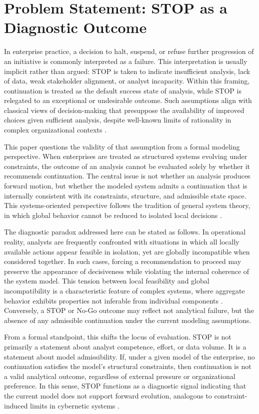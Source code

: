 ﻿\section{Problem Statement: STOP as a Diagnostic Outcome}

In enterprise practice, a decision to halt, suspend, or refuse further progression of an initiative is commonly interpreted as a failure. This interpretation is usually implicit rather than argued: STOP is taken to indicate insufficient analysis, lack of data, weak stakeholder alignment, or analyst incapacity. Within this framing, continuation is treated as the default success state of analysis, while STOP is relegated to an exceptional or undesirable outcome. Such assumptions align with classical views of decision-making that presuppose the availability of improved choices given sufficient analysis, despite well-known limits of rationality in complex organizational contexts \cite{simon1957}.

This paper questions the validity of that assumption from a formal modeling perspective. When enterprises are treated as structured systems evolving under constraints, the outcome of an analysis cannot be evaluated solely by whether it recommends continuation. The central issue is not whether an analysis produces forward motion, but whether the modeled system admits a continuation that is internally consistent with its constraints, structure, and admissible state space. This systems-oriented perspective follows the tradition of general system theory, in which global behavior cannot be reduced to isolated local decisions \cite{bertalanffy1968}.

The diagnostic paradox addressed here can be stated as follows. In operational reality, analysts are frequently confronted with situations in which all locally available actions appear feasible in isolation, yet are globally incompatible when considered together. In such cases, forcing a recommendation to proceed may preserve the appearance of decisiveness while violating the internal coherence of the system model. This tension between local feasibility and global incompatibility is a characteristic feature of complex systems, where aggregate behavior exhibits properties not inferable from individual components \cite{anderson1972}. Conversely, a STOP or No-Go outcome may reflect not analytical failure, but the absence of any admissible continuation under the current modeling assumptions.

From a formal standpoint, this shifts the locus of evaluation. STOP is not primarily a statement about analyst competence, effort, or data volume. It is a statement about model admissibility. If, under a given model of the enterprise, no continuation satisfies the model’s structural constraints, then continuation is not a valid analytical outcome, regardless of external pressure or organizational preference. In this sense, STOP functions as a diagnostic signal indicating that the current model does not support forward evolution, analogous to constraint-induced limits in cybernetic systems \cite{ashby1956}.

